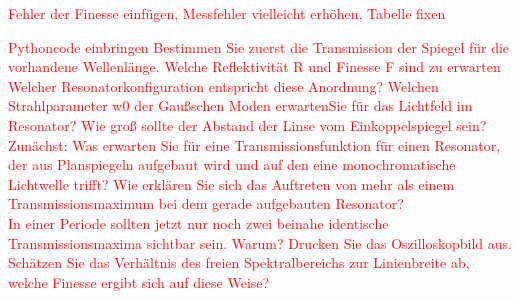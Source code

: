 \documentclass{article}
\begin{document}

\textcolor{red}{Fehler der Finesse einfügen, Messfehler vielleicht erhöhen, Tabelle fixen} %

\textcolor{red}{
Pythoncode einbringen
Bestimmen Sie zuerst die Transmission der Spiegel für die vorhandene Wellenlänge. Welche
Reflektivität R und Finesse F sind zu erwarten
Welcher Resonatorkonfiguration entspricht diese Anordnung? Welchen Strahlparameter w0 der Gaußschen Moden erwartenSie für das Lichtfeld im Resonator? Wie groß sollte der Abstand der Linse vom Einkoppelspiegel sein?
Zunächst: Was erwarten Sie für eine Transmissionsfunktion für einen Resonator, der aus Planspiegeln aufgebaut wird und auf den eine monochromatische Lichtwelle trifft? Wie erklären Sie sich das Auftreten von mehr als einem Transmissionsmaximum bei dem gerade aufgebauten Resonator? \\
In einer Periode sollten jetzt nur noch zwei beinahe identische Transmissionsmaxima sichtbar sein. Warum? Drucken Sie das Oszilloskopbild aus. Schätzen Sie das Verhältnis des freien Spektralbereichs zur Linienbreite ab, welche Finesse ergibt sich auf diese Weise?}\\
\end{document}
